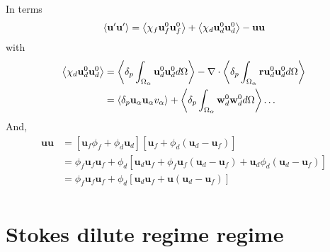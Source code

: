 \documentclass[12pt]{My_preprint}
\begin{document}
In terms
\begin{align*}
    \left< \textbf{u}'\textbf{u}'\right>
    = 
    \left<\chi_f \textbf{u}^0_f\textbf{u}^0_f\right>
    + \left<\chi_d \textbf{u}^0_d\textbf{u}^0_d\right>
    - \textbf{uu}
\end{align*}
with 
\begin{align*}
    \left<\chi_d \textbf{u}^0_d\textbf{u}^0_d\right>
    &= 
    \left<\delta_p \int_{\Omega_{\alpha}} \textbf{u}^0_d\textbf{u}^0_d d\Omega\right>
    -\mathbf{\nabla}\cdot \left<\delta_p \int_{\Omega_{\alpha}} \textbf{r}\textbf{u}^0_d\textbf{u}^0_d d\Omega\right>\\
    &= 
    \left<\delta_p \textbf{u}_\alpha\textbf{u}_\alpha v_\alpha\right>
    + \left<\delta_p \int_{\Omega_{\alpha}} \textbf{w}_d^0\textbf{w}^0_d d\Omega\right> \ldots
\end{align*}
And, 
\begin{align*}
    \textbf{uu} 
    &= 
    [\textbf{u}_f\phi_f + \phi_d \textbf{u}_d ] 
    [\textbf{u}_f + \phi_d( \textbf{u}_d - \textbf{u}_f)] \\
    &= 
    \phi_f \textbf{u}_f \textbf{u}_f
    + \phi_d [\textbf{u}_d \textbf{u}_f
    + \phi_f  \textbf{u}_f ( \textbf{u}_d - \textbf{u}_f)
    +  \textbf{u}_d \phi_d( \textbf{u}_d - \textbf{u}_f) ]\\
    &= 
    \phi_f \textbf{u}_f \textbf{u}_f
    + \phi_d [\textbf{u}_d \textbf{u}_f
    + \textbf{u} ( \textbf{u}_d - \textbf{u}_f)]\\
\end{align*}
\section{Stokes dilute regime regime }
\end{document}
